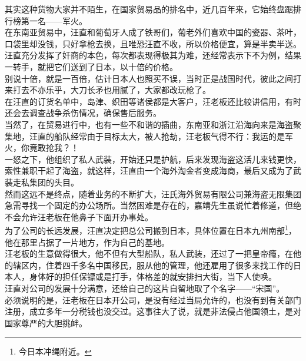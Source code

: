 \begin{multicols}{\theparacolNo}
其实这种货物大家并不陌生，在国家贸易品的排名中，近几百年来，它始终盘踞排行榜第一名——军火。\\

在东南亚贸易中，汪直和葡萄牙人成了铁哥们，葡老外们喜欢中国的瓷器、茶叶，口袋里却没钱，只好拿枪去换，且唯恐汪直不收，所以价格便宜，算是半卖半送。\\

汪直充分发挥了奸商的本色，每次都表现得极其为难，还经常表示下不为例，结果一转手，就把它们送到了日本，以十倍的价格。\\

别说十倍，就是一百倍，估计日本人也照买不误，当时正是战国时代，彼此之间打来打去不亦乐乎，大刀长矛也用腻了，大家都改玩枪了。\\

在汪直的订货名单中，岛津、织田等诸侯都是大客户，汪老板还比较讲信用，有时还会去调查战争杀伤情况，确保售后服务。\\

当然了，在贸易进行中，也有一些不和谐的插曲，东南亚和浙江沿海向来是海盗聚集地，汪直的船队经常由于目标太大，被人抢劫，汪老板气得不行：我运的是军火，你竟敢抢我？！\\

一怒之下，他组织了私人武装，开始还只是护航，后来发现海盗这活儿来钱更快，索性兼职干起了海盗，就这样，汪直由一个海外淘金者变成海商，最后又成为了武装走私集团的头目。\\

然而这远不是终点，随着业务的不断扩大，汪氏海外贸易有限公司兼海盗无限集团急需寻找一个固定的办公场所。当然困难是存在的，嘉靖先生虽说忙着修道，但绝不会允许汪老板在他鼻子下面开办事处。\\

为了公司的长远发展，汪直决定把总公司搬到日本，具体位置在日本九州南部\footnote{今日本冲绳附近。}，他在那里占据了一片地方，作为自己的基地。\\

汪老板的生意做得很大，他不但有大型船队，私人武装，还过了一把皇帝瘾，在他的辖区内，住着四千多名中国移民，服从他的管理，他还雇用了很多来找工作的日本人，身体好的担任保镖或是打手，体格差的就安排扫大街，当下人使唤。\\

汪直对公司的发展十分满意，还给自己的这片自留地取了个名字——“宋国”。\\

必须说明的是，汪老板在日本开公司，是没有经过当局允许的，也没有到有关部门注册，成立多年一分税钱也没交过。这事往大了说，就是非法侵占他国领土，是对国家尊严的大胆挑衅。\\


\end{multicols}
